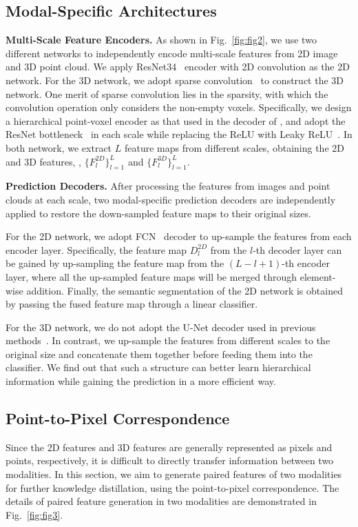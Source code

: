 \documentclass[runningheads]{llncs}
\begin{document}
	

	
	\subsection{Modal-Specific Architectures}
	\label{sec:modal-specific}
	\noindent\textbf{Multi-Scale Feature Encoders.}
	As shown in Fig.~\ref{fig:fig2}, we use two different networks to independently encode multi-scale features from 2D image and 3D point cloud.
We apply ResNet34~\cite{he2016deep} encoder with 2D convolution as the 2D network.
For the 3D network, we adopt sparse convolution~\cite{SparseConv} to construct the 3D network.
One merit of sparse convolution lies in the sparsity, with which the convolution operation only considers the non-empty voxels. 
Specifically, we design a hierarchical point-voxel encoder as that used in the decoder of \cite{tang2020searching}, and adopt the ResNet bottleneck~\cite{he2016deep} in each scale while replacing the ReLU with Leaky ReLU~\cite{maas2013rectifier}.
In both network, we extract $L$ feature maps from different scales, obtaining the 2D and 3D features, \ie, $\{F^{2D}_l\}_{l=1}^L$ and $\{F^{3D}_l\}_{l=1}^L$.
	
	\noindent\textbf{Prediction Decoders.}
After processing the features from images and point clouds at each scale, two modal-specific prediction decoders are independently applied to restore the down-sampled feature maps to their original sizes.
	
	
	For the 2D network, we adopt FCN~\cite{long2015fully} decoder to up-sample the features from each encoder layer.
Specifically, the feature map $D^{2D}_{l}$ from the $l$-th decoder layer can be gained by up-sampling the feature map from the $(L-l+1)$-th encoder layer, where all the up-sampled feature maps will be merged through element-wise addition.
Finally, the semantic segmentation of the 2D network is obtained by passing the fused feature map through a linear classifier.
	
	For the 3D network, we do not adopt the U-Net decoder used in previous methods~\cite{zhou2020cylinder3d,tang2020searching,cheng20212}.
In contrast, we up-sample the features from different scales to the original size and concatenate them together before feeding them into the classifier.
We find out that such a structure can better learn hierarchical information while gaining the prediction in a more efficient way.
	
	\subsection{Point-to-Pixel Correspondence}
	\label{sec:feat}
	Since the 2D features and 3D features are generally represented as pixels and points, respectively, it is difficult to directly transfer information between two modalities.
In this section, we aim to generate paired features of two modalities for further knowledge distillation, using the point-to-pixel correspondence.
The details of paired feature generation in two modalities are demonstrated in Fig.~\ref{fig:fig3}.
	
\end{document}
